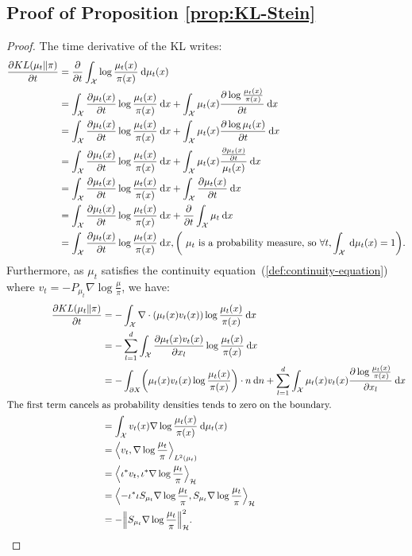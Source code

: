 \documentclass{article}
\newcommand{\X}{\mathcal{X}}
\renewcommand{\H}{\mathcal{H}}
\newcommand{\diff}[2]{\frac{\partial #1}{\partial #2}}
\renewcommand{\d}{\: \mathrm{d}}
\DeclarePairedDelimiter{\norm}{\|}{\|}
\DeclarePairedDelimiter{\pare}{(}{)}
\DeclarePairedDelimiter{\sca}{\langle}{\rangle}
\begin{document}
\subsection{Proof of Proposition \ref{prop:KL-Stein}}\label{pro:KL-Stein}
\begin{proof}
  The time derivative of the KL writes:
  \begin{align*}
    \diff{KL(\mu_t \| \pi)}{t} &= \diff{ }{t} \int_\X \log \frac{\mu_t(x)}{\pi(x)} \d \mu_t(x) \\
    &= \int_\X \diff{\mu_t(x)}{t} \log \frac{\mu_t(x)}{\pi(x)} \d x
      + \int_\X \mu_t(x) \diff{\log \frac{\mu_t(x)}{\pi(x)}}{t} \d x \\
    &= \int_\X \diff{\mu_t(x)}{t} \log \frac{\mu_t(x)}{\pi(x)} \d x
      + \int_\X \mu_t(x) \diff{\log \mu_t(x)}{t} \d x \\
    &= \int_\X \diff{\mu_t(x)}{t} \log \frac{\mu_t(x)}{\pi(x)} \d x
      + \int_\X \mu_t(x) \frac{\diff{\mu_t(x)}{t}}{\mu_t(x)} \d x \\
    &= \int_\X \diff{\mu_t(x)}{t} \log \frac{\mu_t(x)}{\pi(x)} \d x
      + \int_\X \diff{\mu_t(x)}{t} \d x \\
    &= \int_\X \diff{\mu_t(x)}{t} \log \frac{\mu_t(x)}{\pi(x)} \d x
      + \diff{}{t} \int_\X \mu_t \d x \\
    &= \int_\X \diff{\mu_t(x)}{t} \log \frac{\mu_t(x)}{\pi(x)} \d x
   , \pare*{\text{ $\mu_t$ is a probability measure, so } \forall t, \int_\X \d \mu_t(x) = 1}.
  \end{align*}
  Furthermore, as $\mu_t$ satisfies the continuity equation~(\ref{def:continuity-equation})
  where $v_t = -P_{\mu_t} \nabla \log \frac{\mu}{\pi}$, we have:
  \begin{align*}
    \diff{KL(\mu_t \| \pi)}{t} &= -\int_\X \nabla \cdot (\mu_t(x) v_t(x)) \log \frac{\mu_t(x)}{\pi(x)} \d x \\
    &= -\sum_{l=1}^d \int_\X \diff{\mu_t(x) v_t(x)}{x_l} \log \frac{\mu_t(x)}{\pi(x)} \d x \\
    &= -\int_{\partial X} \pare* {\mu_t(x) v_t(x) \log \frac{\mu_t(x)}{\pi(x)}} \cdot n \d n
      + \sum_{l=1}^d \int_\X \mu_t(x) v_t(x) \diff{\log \frac{\mu_t(x)}{\pi(x)}}{x_l} \d x \\
    \text{The first term cancels }& \text{as probability densities tends to zero on the boundary.} \\
    &= \int_\X v_t(x) \nabla \log \frac{\mu_t(x)}{\pi(x)} \d \mu_t(x) \\
    &= \sca*{v_t, \nabla \log \frac{\mu_t}{\pi}}_{L^2(\mu_t)} \\
    &= \sca*{\iota^* v_t, \iota^* \nabla \log \frac{\mu_t}{\pi}}_{\H} \\
    &= \sca*{-\iota^* \iota S_{\mu_t} \nabla \log \frac{\mu_t}{\pi}, S_{\mu_t} \nabla \log \frac{\mu_t}{\pi}}_{\H} \\
    &= -\norm*{S_{\mu_t} \nabla \log \frac{\mu_t}{\pi}}_\H^2.
  \end{align*}
\end{proof}
\end{document}

